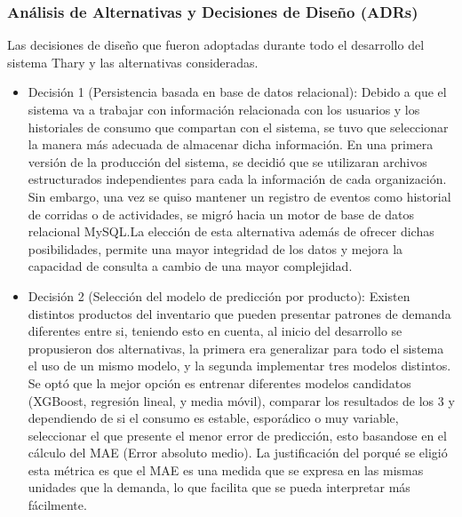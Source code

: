 \subsubsection{Análisis de Alternativas y Decisiones de Diseño (ADRs)}

Las decisiones de diseño que fueron adoptadas durante todo el desarrollo del sistema Thary y las alternativas consideradas.

\begin{itemize}
    \item Decisión 1 (Persistencia basada en base de datos relacional): Debido a que el sistema va a trabajar con información relacionada con los usuarios y los historiales de consumo que compartan con el sistema, se tuvo que seleccionar la manera más adecuada de almacenar dicha información. En una primera versión de la producción del sistema, se decidió que se utilizaran archivos estructurados independientes para cada la información de cada organización. Sin embargo, una vez se quiso mantener un registro de eventos como historial de corridas o de actividades, se migró hacia un motor de base de datos relacional MySQL.La elección de esta alternativa además de ofrecer dichas posibilidades, permite una mayor integridad de los datos y mejora la capacidad de consulta a cambio de una mayor complejidad.
    
    \item Decisión 2 (Selección del modelo de predicción por producto): Existen distintos productos del inventario que pueden presentar patrones de demanda diferentes entre si, teniendo esto en cuenta, al inicio del desarrollo se propusieron dos alternativas, la primera era generalizar para todo el sistema el uso de un mismo modelo, y la segunda implementar tres modelos distintos. Se optó que la mejor opción es entrenar diferentes modelos candidatos (XGBoost, regresión lineal, y media móvil), comparar los resultados de los 3 y dependiendo de si el consumo es estable, esporádico o muy variable, seleccionar el que presente el menor error de predicción, esto basandose en el cálculo del MAE (Error absoluto medio). La justificación del porqué se eligió esta métrica es que el MAE es una medida que se expresa en las mismas unidades que la demanda, lo que facilita que se pueda interpretar más fácilmente.


\end{itemize}
